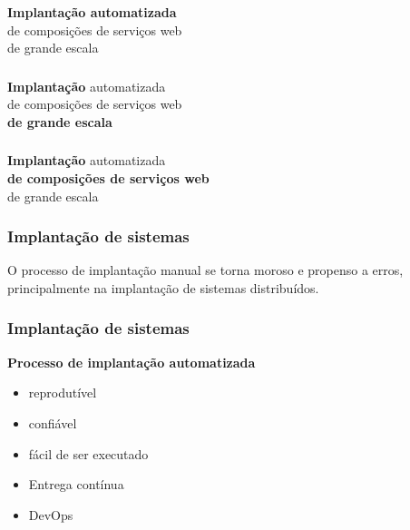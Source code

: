 \documentclass{beamer}
\newcommand\subtitulo[1]{{\large \textbf{#1}}}
\newcommand\frase[1]{\begin{center}\large#1\end{center}}
\begin{document}

\begin{frame}
\frametitle{}
\begin{center}
\huge
\textbf{Implantação automatizada} \\ de composições de serviços web \\ de grande escala
\end{center}
\end{frame}


\begin{frame}
\frametitle{}
\begin{center}
\huge
\textbf{Implantação} automatizada \\ de composições de serviços web \\ \textbf{de grande escala}
\end{center}
\end{frame}


\begin{frame}
\frametitle{}
\begin{center}
\huge
\textbf{Implantação} automatizada \\ \textbf{de composições de serviços web} \\ de grande escala
\end{center}
\end{frame}


\begin{frame}
\frametitle{Implantação de sistemas}

\frase{O processo de implantação manual se torna moroso e propenso a erros,
principalmente na implantação de sistemas distribuídos.}

\end{frame}


\begin{frame}
\frametitle{Implantação de sistemas}

\subtitulo{Processo de implantação automatizada}

\begin{itemize}
\item reprodutível
\item confiável
\item fácil de ser executado
\end{itemize}

\begin{itemize}
\item Entrega contínua
\item DevOps
\end{itemize}

\end{frame}
\end{document}
